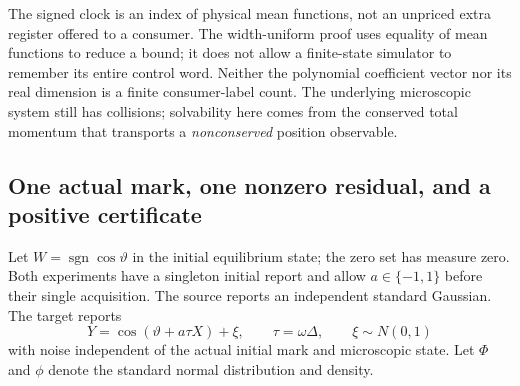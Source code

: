 \begin{remark}
The signed clock is an index of physical mean functions, not an
unpriced extra register offered to a consumer. The width-uniform proof
uses equality of mean functions to reduce a bound; it does not allow
a finite-state simulator to remember its entire control word. Neither
the polynomial coefficient vector nor its real dimension is a finite
consumer-label count. The underlying microscopic system still has
collisions; solvability here comes from the conserved total momentum
that transports a \emph{nonconserved} position observable.
\end{remark}

\subsection{One actual mark, one nonzero residual, and a positive certificate}
Let $W=\operatorname{sgn}\cos\vartheta$ in the initial equilibrium
state; the zero set has measure zero. Both experiments have a singleton
initial report and allow $a\in\{-1,1\}$ before their single acquisition.
The source reports an independent standard Gaussian. The target reports
\[
 Y=\cos(\vartheta+a\tau X)+\xi,\qquad
 \tau=\omega\Delta,\qquad \xi\sim N(0,1)
\]
with noise independent of the actual initial mark and microscopic state.
Let $\Phi$ and $\phi$ denote the standard normal distribution and density.

